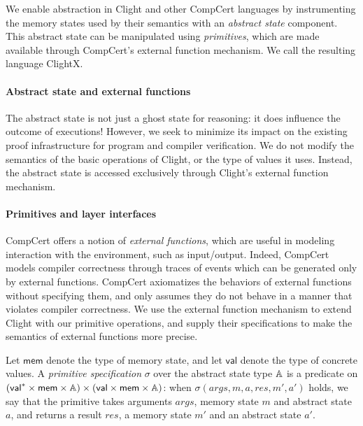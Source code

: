 We enable abstraction in Clight and other CompCert languages
by instrumenting the memory states used by their semantics
with an \emph{abstract state} component.
This abstract state can be manipulated using \emph{primitives},
which are made available through CompCert's external function mechanism.
We call the resulting language ClightX.

\paragraph{Abstract state and external functions}
The abstract state is not just a ghost state for reasoning: it
does influence the outcome of executions!  However, we seek to
minimize its impact on the existing proof
infrastructure for program and compiler verification.
We do not modify the semantics of the basic operations of
Clight, or the type of values it uses.  Instead, the abstract state is
accessed exclusively through Clight's external function mechanism.

\paragraph{Primitives and layer interfaces}
CompCert offers a notion of \emph{external functions}, which are
useful in modeling interaction with the environment, such as
input/output. Indeed, CompCert models compiler correctness through
traces of events which can be generated only by external functions.
CompCert axiomatizes the behaviors of external functions without
specifying them, and only assumes they do not behave in a manner that
violates compiler correctness. We use the external function mechanism
to extend Clight with our primitive operations, and supply their
specifications to make the semantics of external functions more
precise.

\begin{definition} \label{def:c-prim}
Let $\textsf{mem}$ denote the type of memory state, and
let $\textsf{val}$ denote the type of concrete values.
A \emph{primitive specification} $\sigma$ over the abstract state type $\mathbb{A}$
is a predicate on $(\textsf{val}^* \times \textsf{mem} \times \mathbb{A}) \times
(\textsf{val} \times \textsf{mem} \times
\mathbb{A})$: when $\sigma(\mathit{args}, m, a, \mathit{res}, m', a')$ holds, we say
that the primitive takes arguments $\mathit{args}$, memory state
$m$ and abstract state $a$, and returns a result $\mathit{res}$, a
memory state $m'$ and an abstract state $a'$.
\end{definition}


